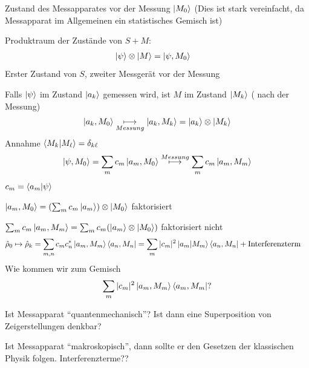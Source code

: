 	Zustand des Messapparates vor der Messung $\ket{M_0}$ 
	(Dies ist stark vereinfacht, da Messapparat im Allgemeinen ein statistisches Gemisch ist)
	
	Produktraum der Zustände von $S + M$:
		\begin{align*}
			\ket{\psi} \otimes \ket{M} &= \ket{\psi, M_0}
		\end{align*}
	Erster Zustand von $S$, zweiter Messgerät vor der Messung
	
	Falls $\ket{\psi}$ im Zustand $\ket{a_k}$ gemessen wird, ist $M$ im Zustand $\ket{M_k}$ ( nach der Messung) 
		\begin{align*}
			\ket{a_k, M_0} \underset{Messung}{\longmapsto} \ket{a_k, M_k}
			= \ket{a_k} \otimes \ket{M_k}
		\end{align*}
	Annahme $\braket{M_k | M_\ell} = \delta_{k\ell}$
		\begin{align*}
			\ket{\psi, M_0} = \sum_m c_m \ket{a_m, M_0} \overset{Messung}{\longmapsto}
			\sum_m c_m \ket{a_m, M_m}
		\end{align*}
	$c_m = \braket{a_m | \psi}$
	
	$\ket{a_m, M_0} = (\sum_m c_m \ket{a_m}) \otimes \ket{M_0}$ faktorisiert
	
	$\sum_m c_m \ket{a_m, M_m} = \sum_m c_m (\ket{a_m} \otimes \ket{M_0})$ faktorisiert nicht
	\begin{align*}
		\hat{\rho}_0 \mapsto \hat{\rho}_k &=
		\sum_{m,n} c_m c^*_n \ket{a_m, M_m} \bra{a_n, M_n} =
		\sum_m |c_m|^2 \ket{a_m| M_m }\bra{a_n, M_n} + \text{Interferenzterm}
	\end{align*}
	Wie kommen wir zum Gemisch
		\begin{align*}
			\sum_m |c_m|^2 \ket{a_m, M_m} \bra{a_m, M_m} ?
		\end{align*}
	
%	
%	
	Ist Messapparat ``quantenmechanisch''? Ist dann eine Superposition von Zeigerstellungen denkbar?
	
	Ist Messapparat ``makroskopisch'', dann sollte er den Gesetzen der klassischen Physik folgen. Interferenzterme??
	
